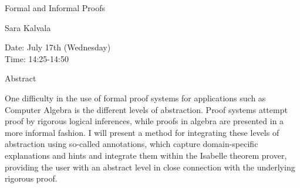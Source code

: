 \begin{center}
\LARGE
Formal and Informal Proofs
\end{center}

\begin{center}
\Large
Sara Kalvala
\end{center}

\noindent
Date:  July 17th (Wednesday)\\
Time:  14:25-14:50\\

\begin{center}
\large
Abstract
\end{center}

One difficulty in the use of formal proof systems for applications
such as Computer Algebra is the different levels of abstraction. Proof
systems attempt proof by rigorous logical inferences, while proofs in
algebra are presented in a more informal fashion. I will present a
method for integrating these levels of abstraction using so-called
annotations, which capture domain-specific explanations and hints and
integrate them within the Isabelle theorem prover, providing the user
with an abstract level in close connection with the underlying
rigorous proof.


